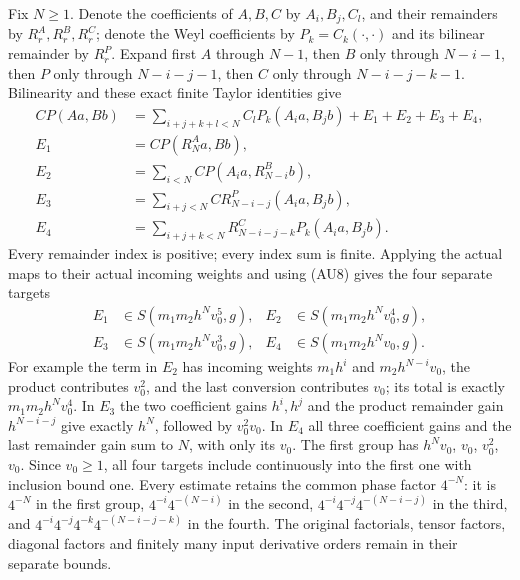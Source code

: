 \documentclass[
  11pt,
]{article}
\begin{document}
Fix \(N\ge1\). Denote the coefficients of \(A,B,C\) by \(A_i,B_j,C_l\),
and their remainders by \(R^A_r,R^B_r,R^C_r\); denote the Weyl
coefficients by \(P_k=C_k(\cdot,\cdot)\) and its bilinear remainder by
\(R^P_r\). Expand first \(A\) through \(N-1\), then \(B\) only through
\(N-i-1\), then \(P\) only through \(N-i-j-1\), then \(C\) only through
\(N-i-j-k-1\). Bilinearity and these exact finite Taylor identities give
\[
\begin{aligned}
C P(Aa,Bb)&=\sum_{i+j+k+l<N}C_lP_k(A_i a,B_j b)
                    +E_1+E_2+E_3+E_4,\\
E_1&=C P(R_N^A a,Bb),\\
E_2&=\sum_{i<N}C P(A_i a,R_{N-i}^B b),\\
E_3&=\sum_{i+j<N}C R_{N-i-j}^P(A_i a,B_j b),\\
E_4&=\sum_{i+j+k<N}R_{N-i-j-k}^C P_k(A_i a,B_j b).
\end{aligned}
\tag{AU11}
\] Every remainder index is positive; every index sum is finite.
Applying the actual maps to their actual incoming weights and using
(AU8) gives the four separate targets \[
\begin{aligned}
E_1&\in S(m_1m_2h^Nv_0^5,g),&
E_2&\in S(m_1m_2h^Nv_0^4,g),\\
E_3&\in S(m_1m_2h^Nv_0^3,g),&
E_4&\in S(m_1m_2h^Nv_0,g).
\end{aligned}
\tag{AU12}
\] For example the term in \(E_2\) has incoming weights \(m_1h^i\) and
\(m_2h^{N-i}v_0\), the product contributes \(v_0^2\), and the last
conversion contributes \(v_0\); its total is exactly \(m_1m_2h^Nv_0^4\).
In \(E_3\) the two coefficient gains \(h^i,h^j\) and the product
remainder gain \(h^{N-i-j}\) give exactly \(h^N\), followed by
\(v_0^2v_0\). In \(E_4\) all three coefficient gains and the last
remainder gain sum to \(N\), with only its \(v_0\). The first group has
\(h^Nv_0\), \(v_0\), \(v_0^2\), \(v_0\). Since \(v_0\ge1\), all four
targets include continuously into the first one with inclusion bound
one. Every estimate retains the common phase factor \(4^{-N}\): it is
\(4^{-N}\) in the first group, \(4^{-i}4^{-(N-i)}\) in the second,
\(4^{-i}4^{-j}4^{-(N-i-j)}\) in the third, and
\(4^{-i}4^{-j}4^{-k}4^{-(N-i-j-k)}\) in the fourth. The original
factorials, tensor factors, diagonal factors and finitely many input
derivative orders remain in their separate bounds.
\end{document}
